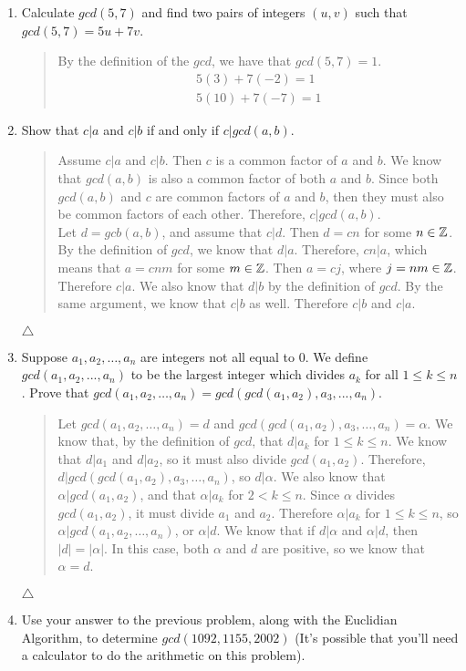 \documentclass{hw}
\begin{document}

\begin{enumerate}
\item Calculate $gcd(5, 7)$ and find two pairs of integers $(u, v)$ such that $gcd(5, 7) = 5u + 7v$.
\begin{quote}
By the definition of the $gcd$, we have that $gcd(5,7) = 1$.
\begin{gather*}
5(3) + 7(-2) = 1\\
5(10) + 7(-7) = 1
\end{gather*}
\end{quote}

\item Show that $c|a$ and $c|b$ if and only if $c | gcd(a,b)$.
\begin{quote}

Assume $c|a$ and $c|b$. Then $c$ is a common factor of $a$ and $b$. We know that $gcd(a,b)$ is also
a common factor of both $a$ and $b$. Since both $gcd(a,b)$ and $c$ are common factors of $a$ and
$b$, then they must also be common factors of each other. Therefore, $c|gcd(a,b)$.\\

Let $d = gcb(a,b)$, and assume that $c|d$. Then $d = cn$ for some $n\in\mathbb{Z}$. By the definition of
$gcd$, we know that $d|a$. Therefore, $cn|a$, which means that $a = cnm$ for some $m\in\mathbb{Z}$. Then
$a = cj$, where $j = nm\in\mathbb{Z}$. Therefore $c|a$. We also know that $d|b$ by the definition of
$gcd$. By the same argument, we know that $c|b$ as well. Therefore $c|b$ and $c|a$.
\end{quote}
$\triangle$

\item Suppose $a_{1},a_{2},\dots,a_{n}$ are integers not all equal to 0. We define
$gcd(a_{1},a_{2},...,a_{n})$ to be the largest integer which divides $a_{k}$ for all $1 \leq k \leq
n$. Prove that $gcd(a_{1},a_{2},\dots,a_{n}) = gcd(gcd(a_{1},a_{2}),a_{3},...,a_{n})$.
\begin{quote}
Let $gcd(a_{1},a_{2},\dots,a_{n}) = d$ and $gcd(gcd(a_{1},a_{2}),a_{3},\dots,a_{n}) = \alpha$. We
know that, by the definition of $gcd$, that $d|a_{k}$ for $1 \leq k \leq n$. We know that $d|a_{1}$
and $d|a_{2}$, so it must also divide $gcd(a_{1},a_{2})$. Therefore, $d|gcd(gcd(a_{1},a_{2})
,a_{3},\dots,a_{n})$, so $d|\alpha$. We also know that $\alpha|gcd(a_{1},a_{2})$, and that
$\alpha|a_{k}$ for $2 < k \leq n$. Since $\alpha$ divides $gcd(a_{1},a_{2})$, it must divide
$a_{1}$ and $a_{2}$. Therefore $\alpha|a_{k}$ for $1 \leq k \leq n$, so
$\alpha|gcd(a_{1},a_{2},\dots,a_{n})$, or $\alpha|d$. We know that if $d|\alpha$ and
$\alpha|d$, then $|d| = |\alpha|$. In this case, both $\alpha$ and $d$ are positive,
so we know that $\alpha = d$.
\end{quote}
$\triangle$

\item Use your answer to the previous problem, along with the Euclidian Algorithm, to determine
$gcd(1092,1155,2002)$ (It's possible that you'll need a calculator to do the arithmetic on this
problem).
\begin{quote}

\end{quote}
\end{enumerate}
\end{document}
